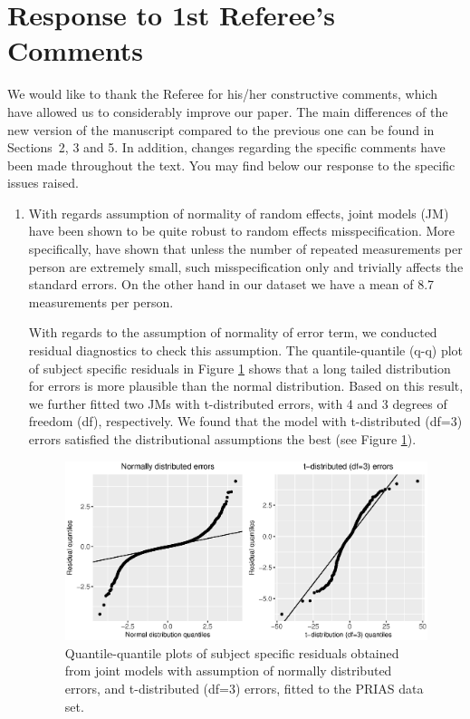 \clearpage
\section*{Response to 1st Referee's Comments}
We would like to thank the Referee for his/her constructive comments, which have allowed us to considerably improve our paper. The main differences of the new version of the manuscript compared to the previous one can be found in Sections~2, 3 and 5. In addition, changes regarding the specific comments have been made throughout the text.
You may find below our response to the specific issues raised.

\begin{enumerate}
	\item With regards assumption of normality of random effects, joint models (JM) have been shown to be quite robust to random effects misspecification. More specifically, \citet*{rizopoulos2008shared,huang2009latent} have shown that unless the number of repeated measurements per person are extremely small, such misspecification only and trivially affects the standard errors. On the other hand in our dataset we have a mean of 8.7 measurements per person. 

	With regards to the assumption of normality of error term, we conducted residual diagnostics to check this assumption. The quantile-quantile (q-q) plot of subject specific residuals in Figure \ref{fig : qqplot_norm_t3} shows that a long tailed distribution for errors is more plausible than the normal distribution. Based on this result, we further fitted two JMs with t-distributed errors, with 4 and 3 degrees of freedom (df), respectively. We found that the model with t-distributed (df=3) errors satisfied the distributional assumptions the best (see Figure \ref{fig : qqplot_norm_t3}). 

	\begin{figure}[!htb]
	\centerline{\includegraphics[width=\columnwidth]{images/model_fit/qqplot_norm_t3.eps}}
	\caption{Quantile-quantile plots of subject specific residuals obtained from joint models with assumption of normally distributed errors, and t-distributed (df=3) errors, fitted to the PRIAS data set.}
	\label{fig : qqplot_norm_t3}
	\end{figure}


\end{enumerate}
